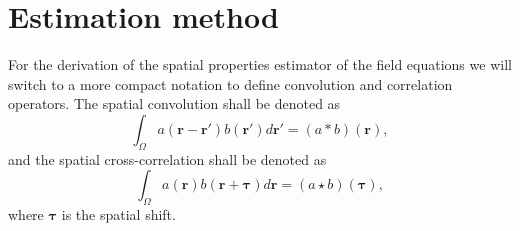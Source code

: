 \documentclass[10pt,twocolumn,twoside]{IEEEtran}
\begin{document}
\section{Estimation method}\label{sec:EstimationMethod}
For the derivation of the spatial properties estimator of the field equations we will switch to a more compact notation to define convolution and correlation operators. The spatial convolution shall be denoted as
\begin{equation}
	\int_\Omega a(\mathbf{r}-\mathbf{r}')b(\mathbf{r}')d\mathbf{r}' = (a\ast b)(\mathbf{r}),
\end{equation}
and the spatial cross-correlation shall be denoted as 
\begin{equation}
	\int_\Omega a(\mathbf{r})b(\mathbf{r}+\boldsymbol{\tau})d\mathbf{r} = (a\star b)(\boldsymbol{\tau}),
\end{equation} 
where $\boldsymbol{\tau}$ is the spatial shift.
\end{document}
